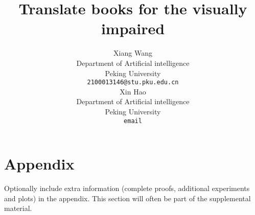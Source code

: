 \documentclass{article}
\title{Translate books for the visually impaired}
\author{%
  Xiang Wang\\
  Department of Artificial intelligence\\
  Peking University\\
  \texttt{2100013146@stu.pku.edu.cn} \\
  \And
  Xin Hao \\
  Department of Artificial intelligence\\
  Peking University\\
  \texttt{email} \\
}
\begin{document}
\maketitle

\begin{abstract}
\end{abstract}






\appendix

\section{Appendix}

Optionally include extra information (complete proofs, additional experiments and plots) in the appendix. This section will often be part of the supplemental material.
\end{document}
